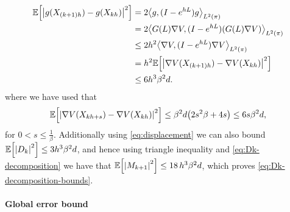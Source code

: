 \documentclass[11pt,a4paper]{article}
\begin{document}
    \begin{align*}
        \expe{\abs*{g(X_{(k+1)h}) - g(X_{kh})}^{2}} &= 2\scal*{g,(I-e^{hL}) g}_{L^2(\pi)}
        \\
        & = 2\scal*{G(L)\nabla V,(I-e^{hL}) \tond*{G(L) \nabla V}}_{L^2(\pi)}
        \\
        & \le 2h^2 \scal*{\nabla V,(I-e^{hL}) { \nabla V}}_{L^2(\pi)}
        \\
        & = h^2\expe{\abs*{\nabla V(X_{(k+1)h}) -\nabla V(X_{kh}) }^2}
        \\
        & \leq 6h^3\beta^2 d.
    \end{align*}
    where we have used that 
    \begin{equation}\label{eq:displacement}
        \expe{\abs*{\nabla V(X_{kh+s}) -\nabla V(X_{kh}) }^2} \leq \beta^2 d\tond*{2s^2 \beta + 4s} \leq 6s\beta^2 d,
    \end{equation}
    for $0< s \leq \frac{1}{\beta}$. Additionally using \eqref{eq:displacement} we can also bound $\expe{\abs*{D_{k}}^2} \leq 3h^3\beta^2 d$, and hence using triangle inequality and \eqref{eq:Dk-decomposition} we have that $\expe{\abs*{M_{k+1}}^2} \leq 18 \, h^3 \beta^2 d$, which proves \eqref{eq:Dk-decomposition-bounds}.
    
    \paragraph{Global error bound}
    
\end{document}
